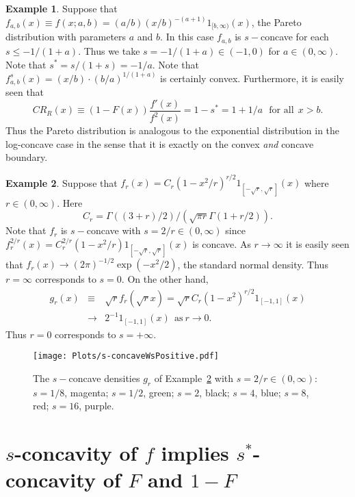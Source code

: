 \documentclass[11pt]{amsart}
\numberwithin{equation}{section}
\theoremstyle{definition}\newtheorem{definition}{Definition}
\theoremstyle{remark}\newtheorem{assumption}{Assumption}
\theoremstyle{remark}\newtheorem{remark}{Remark}
\theoremstyle{definition}\newtheorem{example}{Example}
\theoremstyle{plain}\newtheorem{question}{Question}
\theoremstyle{plain}\newtheorem{theorem}{Theorem}
\theoremstyle{plain}\newtheorem{lemma}{Lemma}
\theoremstyle{plain}\newtheorem{proposition}{Proposition}
\theoremstyle{plain}\newtheorem{corollary}{Corollary}
\theoremstyle{plain}\newtheorem{conjecture}{Conjecture}
\begin{document}
\begin{example}
\label{exmpl:ex3} 
Suppose that $f_{a,b} (x) \equiv f(x; a,b) =  (a/b)(x/b)^{-(a+1)} 1_{[b,\infty)} (x) $, the Pareto distribution 
with parameters $a$ and $b$.  In this case $f_{a,b} $ is $s-$concave for each $s \le -1/(1+a)$.  
Thus we take $s = -1/(1+a) \in (-1,0) $ for $a \in (0, \infty)$.  Note that $s^* = s/(1+s) = -1/a$.    
Note that $f^s_{a,b} (x) = (x/b)\cdot (b/a)^{1/(1+a)}$ is certainly convex.  Furthermore, it is easily seen that 
$$
CR_R (x) \equiv (1-F(x)) \frac{f'(x)}{f^2 (x) } = 1 - s^* = 1+1/a \ \ \ \mbox{for all} \ \ x > b.
$$
Thus the Pareto distribution is analogous to the exponential distribution in the log-concave case in the sense that it 
is exactly on the convex {\sl and} concave boundary.
\end{example}

\begin{example}
\label{exmpl:ex4}
Suppose that $f_r (x) = C_r (1 - x^2/r)^{r/2} 1_{[-\sqrt{r} , \sqrt{r}]} (x)$ where $r \in (0,\infty)$.
Here 
$$
C_r =\Gamma ((3+r)/2)/ (\sqrt{\pi r} \Gamma (1+r/2)) .
$$
Note that 
$f_r$ is $s-$concave with $s = 2/r \in (0,\infty)$ since $f_r^{2/r} (x) = C_r^{2/r}(1-x^2/r) 1_{[-\sqrt{r},\sqrt{r}]} (x)$ is concave.
As $r\rightarrow \infty$ it is easily seen that $f_r (x) \rightarrow (2\pi)^{-1/2} \exp (-x^2/2)$, the standard normal density.
Thus $r=\infty$ corresponds to $s=0$.  On the other hand, 
\begin{eqnarray*}
g_r (x) & \equiv &\sqrt{r} f_r (\sqrt{r} x ) = \sqrt{r} C_r (1-x^2)^{r/2} 1_{[-1,1]} (x)\\
& \rightarrow & 2^{-1} 1_{[-1,1]} (x) \ \ \mbox{as} \ r \rightarrow 0.
\end{eqnarray*}
Thus $r=0$ corresponds to $s = + \infty$.
\end{example} 


\begin{figure}[ht]
    \centering
    \texttt{[image: Plots/s-concaveWsPositive.pdf]}
    \caption{The $s-$concave densities $g_r$ of Example~\ref{exmpl:ex4} with $s = 2/r \in (0,\infty)$: 
    $s=1/8$, magenta; $s=1/2$, green;  $s= 2$, black;  $s=4$, blue;  $s=8$, red;  $s=16$, purple.}
     \label{fig:fig0sConPs}
\end{figure}

\section{$s$-concavity of $f$ implies $s^*$-concavity of $F$ and $1-F$}
\label{sec:SconcavityImpliesBsConcavity}
\end{document}
